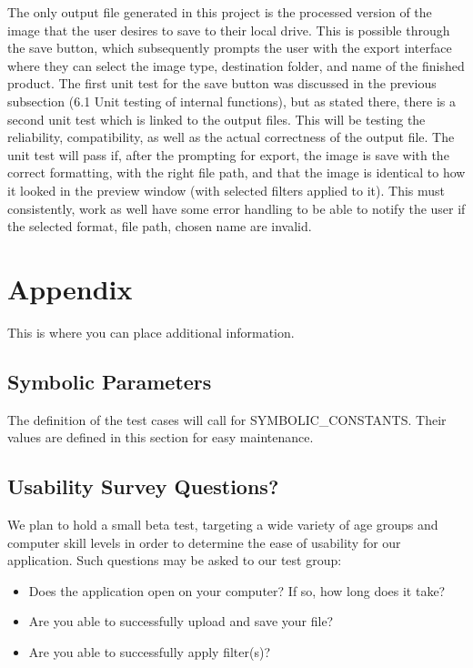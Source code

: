 \documentclass[12pt, titlepage]{article}
\begin{document}
The only output file generated in this project is the processed version of the image that the user desires to save to their local drive. This is possible through the save button, which subsequently prompts the user with the export interface where they can select the image type, destination folder, and name of the finished product. The first unit test for the save button was discussed in the previous subsection (6.1 Unit testing of internal functions), but as stated there, there is a second unit test which is linked to the output files. This will be testing the reliability, compatibility, as well as the actual correctness of the output file. The unit test will pass if, after the prompting for export, the image is save with the correct formatting, with the right file path, and that the image is identical to how it looked in the preview window (with selected filters applied to it). This must consistently, work as well have some error handling to be able to notify the user if the selected format, file path, chosen name are invalid.	





\newpage

\section{Appendix}

This is where you can place additional information.

\subsection{Symbolic Parameters}

The definition of the test cases will call for SYMBOLIC\_CONSTANTS.
Their values are defined in this section for easy maintenance.

\subsection{Usability Survey Questions?}

We plan to hold a small beta test, targeting a wide variety of age groups and computer skill levels in order to determine the ease of usability for our application.  Such questions may be asked to our test group:

\begin{itemize}
	\item Does the application open on your computer? If so, how long does it take?
	\item Are you able to successfully upload and save your file?
	\item Are you able to successfully apply filter(s)?
\end{itemize}
\end{document}
